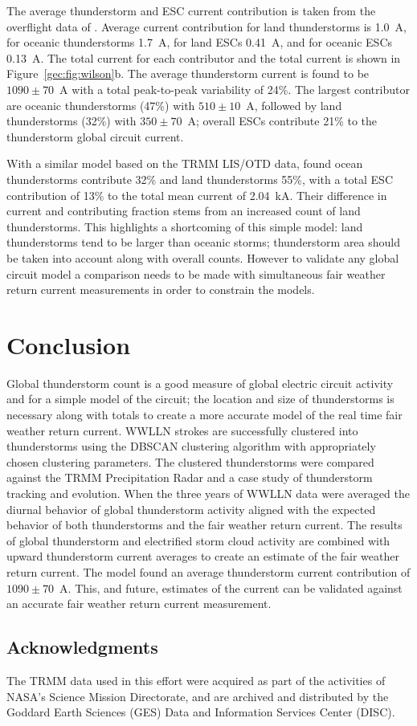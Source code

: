 The average thunderstorm and ESC current contribution is taken from the overflight data of \citet{Mach2010}.
Average current contribution for land thunderstorms is 1.0~A, for oceanic thunderstorms 1.7~A, for land ESCs 0.41~A, and for oceanic ESCs 0.13~A.
The total current for each contributor and the total current is shown in Figure~\ref{gec:fig:wilson}b.
The average thunderstorm current is found to be $1090 \pm 70$~A with a total peak-to-peak variability of 24\%.
The largest contributor are oceanic thunderstorms (47\%) with $510 \pm 10$~A, followed by land thunderstorms (32\%) with $350 \pm 70$~A; overall ESCs contribute 21\% to the thunderstorm global circuit current.

With a similar model based on the TRMM LIS/OTD data, \citet{Mach2011} found ocean thunderstorms contribute 32\% and land thunderstorms 55\%, with a total ESC contribution of 13\% to the total mean current of 2.04~kA.
Their difference in current and contributing fraction stems from an increased count of land thunderstorms.
This highlights a shortcoming of this simple model: land thunderstorms tend to be larger than oceanic storms; thunderstorm area should be taken into account along with overall counts.
However to validate any global circuit model a comparison needs to be made with simultaneous fair weather return current measurements in order to constrain the models.

\section{Conclusion}

Global thunderstorm count is a good measure of global electric circuit activity and for a simple model of the circuit; the location and size of thunderstorms is necessary along with totals to create a more accurate model of the real time fair weather return current.
WWLLN strokes are successfully clustered into thunderstorms using the DBSCAN clustering algorithm with appropriately chosen clustering parameters.
The clustered thunderstorms were compared against the TRMM Precipitation Radar and a case study of thunderstorm tracking and evolution.
When the three years of WWLLN data were averaged the diurnal behavior of global thunderstorm activity aligned with the expected behavior of both thunderstorms and the fair weather return current.
The results of global thunderstorm and electrified storm cloud activity are combined with upward thunderstorm current averages to create an estimate of the fair weather return current.
The model found an average thunderstorm current contribution of $1090 \pm 70$~A.
This, and future, estimates of the current can be validated against an accurate fair weather return current measurement.

\subsection*{Acknowledgments}
The TRMM data used in this effort were acquired as part of the activities of NASA's Science Mission Directorate, and are archived and distributed by the Goddard Earth Sciences (GES) Data and Information Services Center (DISC).
